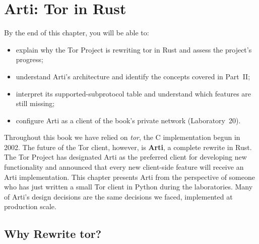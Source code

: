 \chapter{Arti: Tor in Rust}\label{cap:30-arti}

\begin{obiettivi}
By the end of this chapter, you will be able to:
\begin{itemize}[nosep]
  \item explain why the Tor Project is rewriting tor in Rust and assess the project's progress;
  \item understand Arti's architecture and identify the concepts covered in Part~II;
  \item interpret its supported-subprotocol table and understand which features are still missing;
  \item configure Arti as a client of the book's private network (Laboratory~20).
\end{itemize}
\end{obiettivi}

Throughout this book we have relied on \emph{tor}, the C implementation begun in 2002. The future of the Tor client, however, is \textbf{Arti}, a complete rewrite in Rust. The Tor Project has designated Arti as the preferred client for developing new functionality and announced that every new client-side feature will receive an Arti implementation. This chapter presents Arti from the perspective of someone who has just written a small Tor client in Python during the laboratories. Many of Arti's design decisions are the same decisions we faced, implemented at production scale.

\section{Why Rewrite tor?}\label{sec:arti-perche}

